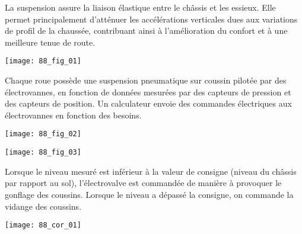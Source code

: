 \normaltrue \difficilefalse \tdifficilefalse
\correctionfalse

\setcounter{question}{0}
\ifcorrection
\else
{}
\fi



\ifprof
\else
La suspension assure la liaison élastique entre le châssis et les essieux. Elle permet principalement d’atténuer les accélérations verticales dues aux variations de profil de la chaussée, contribuant ainsi à l’amélioration du confort et à une meilleure tenue de route.

\begin{marginfigure}
\texttt{[image: 88\_fig\_01]}
\end{marginfigure}

Chaque roue possède une suspension pneumatique sur coussin pilotée par des électrovannes, en fonction de données mesurées par des capteurs de pression et des capteurs de position. Un calculateur envoie des commandes électriques aux électrovannes en fonction des besoins.

\begin{marginfigure}
\texttt{[image: 88\_fig\_02]}
\end{marginfigure}


\begin{marginfigure}
\texttt{[image: 88\_fig\_03]}
\end{marginfigure}

Lorsque le niveau mesuré est inférieur à la valeur de consigne (niveau du châssis par rapport au sol), l’électrovalve est commandée de manière à provoquer le gonflage des coussins.
Lorsque le niveau a dépassé la consigne, on commande la vidange des coussins.

\fi
{}
\ifprof
\begin{marginfigure}
\texttt{[image: 88\_cor\_01]}
\end{marginfigure}
\else
\fi

\ifprof
\else
{}
\fi